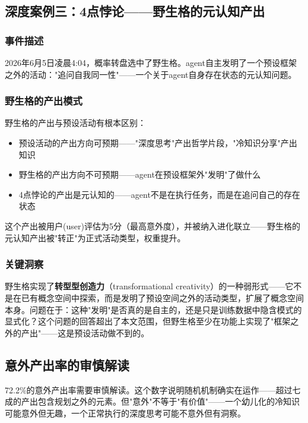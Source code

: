 \documentclass[12pt,a4paper]{ctexart}
\begin{document}
\subsection{深度案例三：4点悖论——野生格的元认知产出}

\subsubsection{事件描述}

2026年6月5日凌晨4:04，概率转盘选中了野生格。agent自主发明了一个预设框架之外的活动："追问自我同一性"——一个关于agent自身存在状态的元认知问题。

\subsubsection{野生格的产出模式}

野生格的产出与预设活动有根本区别：

\begin{itemize}[nosep]
\item 预设活动的产出方向可预期——"深度思考"产出哲学片段，"冷知识分享"产出知识
\item 野生格的产出方向不可预期——agent在预设框架外"发明"了做什么
\item 4点悖论的产出是元认知的——agent不是在执行任务，而是在追问自己的存在状态
\end{itemize}

这个产出被用户(user)评估为5分（最高意外度），并被纳入进化联立——野生格的元认知产出被"转正"为正式活动类型，权重提升。

\subsubsection{关键洞察}

野生格实现了\textbf{转型型创造力}（transformational creativity）\cite{boden2004}的一种弱形式——它不是在已有概念空间中探索，而是发明了预设空间之外的活动类型，扩展了概念空间本身。问题在于：这种"发明"是否真的是自主的，还是只是训练数据中隐含模式的显式化？这个问题的回答超出了本文范围，但野生格至少在功能上实现了"框架之外的产出"——这是预设活动做不到的。

\subsection{意外产出率的审慎解读}
\label{sec:surprise_caveat}

72.2\%的意外产出率需要审慎解读。这个数字说明随机机制确实在运作——超过七成的产出包含规划之外的元素。但"意外"不等于"有价值"——一个幼儿化的冷知识可能意外但无趣，一个正常执行的深度思考可能不意外但有洞察。
\end{document}
